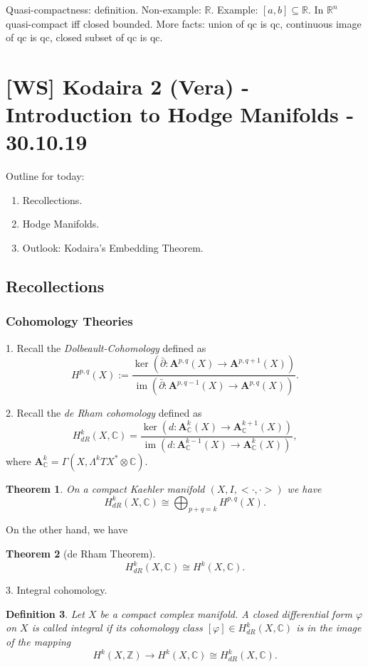 \documentclass[12pt]{article}
\theoremstyle{darkgreentheorem}
\newtheorem{thm}{Theorem}[section]
\theoremstyle{darkbluedefinition}
\newtheorem{defn}[thm]{Definition}
\theoremstyle{darkredexample}
\theoremstyle{remark}
\newcommand{\Z}{\mathbb{Z}}
\newcommand{\R}{\mathbb{R}}
\newcommand{\1}{\mathbbm{1}}
\newcommand{\C}{\mathbb{C}}
\newcommand{\A}{\mathbf{A}}
\DeclareMathOperator{\im}{im}
\newcommand{\ot}{\otimes}
\begin{document}
Quasi-compactness: definition.
Non-example: $\R$.
Example: $[a,b]\subseteq \R$.
In $\R^{n}$ quasi-compact iff closed bounded.
More facts: union of qc is qc, continuous image of qc is qc, closed subset of qc is qc.

\section{[WS] Kodaira 2 (Vera) - Introduction to Hodge Manifolds - 30.10.19}

Outline for today:
\begin{enumerate}[label=\arabic*)]
    \item Recollections.
    \item Hodge Manifolds.
    \item Outlook: Kodaira's Embedding Theorem.
\end{enumerate}

\subsection{Recollections}

\subsubsection{Cohomology Theories}

1. Recall the \textit{Dolbeault-Cohomology} defined as
\[ H^{p,q}(X):=\frac{\ker(\bar{\partial}\colon \A^{p,q}(X)\to \A^{p,q+1}(X))}{\im(\bar{\partial}\colon \A^{p,q-1}(X)\to \A^{p,q}(X))}.\]

2. Recall the \textit{de Rham cohomology} defined as
\[ H_{dR}^{k}(X,\C)=\frac{\ker(d\colon \A_{\C}^{k}(X)\to \A_{\C}^{k+1}(X))}{\im(d\colon \A_{\C}^{k-1}(X)\to \A_{\C}^{k}(X))}, \]
where $\A_{\C}^{k}=\Gamma(X,\Lambda^{k}TX^{*}\ot \C)$.

\begin{thm}
    On a compact Kaehler manifold $(X,I,<\cdot,\cdot>)$ we have
    \[ H_{dR}^{k}(X,\C)\cong \bigoplus_{p+q=k}H^{p,q}(X).\]
\end{thm}

On the other hand, we have

\begin{thm}[de Rham Theorem]
    \[ H_{dR}^{k}(X,\C)\cong H^{k}(X,\C).\]
\end{thm}

3. Integral cohomology.

\begin{defn}
    Let $X$ be a compact complex manifold.
    A closed differential form $\varphi$ on $X$ is called \textit{integral} if its cohomology class $[\varphi]\in H^{k}_{dR}(X,\C)$ is in the image of the mapping
    \[ H^{k}(X,\Z)\to H^{k}(X,\C)\cong H_{dR}^{k}(X,\C). \]
\end{defn}
\end{document}
